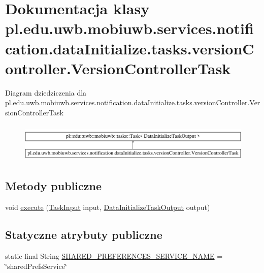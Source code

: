 \hypertarget{classpl_1_1edu_1_1uwb_1_1mobiuwb_1_1services_1_1notification_1_1data_initialize_1_1tasks_1_1versb679418f62fa2115aa7975dd3e456693}{}\section{Dokumentacja klasy pl.\+edu.\+uwb.\+mobiuwb.\+services.\+notification.\+data\+Initialize.\+tasks.\+version\+Controller.\+Version\+Controller\+Task}
\label{classpl_1_1edu_1_1uwb_1_1mobiuwb_1_1services_1_1notification_1_1data_initialize_1_1tasks_1_1versb679418f62fa2115aa7975dd3e456693}
Diagram dziedziczenia dla pl.\+edu.\+uwb.\+mobiuwb.\+services.\+notification.\+data\+Initialize.\+tasks.\+version\+Controller.\+Version\+Controller\+Task\begin{figure}[H]
\begin{center}
\leavevmode
\includegraphics[height=1.901528cm]{classpl_1_1edu_1_1uwb_1_1mobiuwb_1_1services_1_1notification_1_1data_initialize_1_1tasks_1_1versb679418f62fa2115aa7975dd3e456693}
\end{center}
\end{figure}
\subsection*{Metody publiczne}
\begin{DoxyCompactItemize}
\item 
void \hyperlink{classpl_1_1edu_1_1uwb_1_1mobiuwb_1_1services_1_1notification_1_1data_initialize_1_1tasks_1_1versb679418f62fa2115aa7975dd3e456693_a4959816e30a0f729947940485f40b317}{execute} (\hyperlink{classpl_1_1edu_1_1uwb_1_1mobiuwb_1_1tasks_1_1models_1_1_task_input}{Task\+Input} input, \hyperlink{classpl_1_1edu_1_1uwb_1_1mobiuwb_1_1services_1_1notification_1_1data_initialize_1_1_data_initialize_task_output}{Data\+Initialize\+Task\+Output} output)
\end{DoxyCompactItemize}
\subsection*{Statyczne atrybuty publiczne}
\begin{DoxyCompactItemize}
\item 
static final String \hyperlink{classpl_1_1edu_1_1uwb_1_1mobiuwb_1_1services_1_1notification_1_1data_initialize_1_1tasks_1_1versb679418f62fa2115aa7975dd3e456693_a91c04a56b8b2f87e79889f1bc2045f20}{S\+H\+A\+R\+E\+D\+\_\+\+P\+R\+E\+F\+E\+R\+E\+N\+C\+E\+S\+\_\+\+S\+E\+R\+V\+I\+C\+E\+\_\+\+N\+A\+M\+E} = \char`\"{}shared\+Prefs\+Service\char`\"{}
\end{DoxyCompactItemize}


